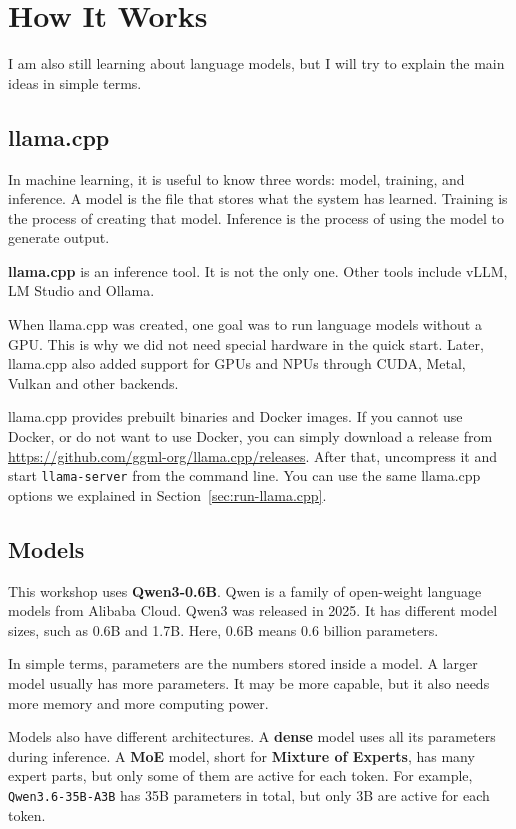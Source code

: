 \documentclass[a4paper,12pt]{article}
\begin{document}
\section{How It Works}

I am also still learning about language models, but I will try to explain the main ideas in simple terms.

\subsection{llama.cpp}
\label{sec:llama.cpp}

In machine learning, it is useful to know three words: model, training, and inference. A model is the file that stores what the system has learned. Training is the process of creating that model. Inference is the process of using the model to generate output.

\textbf{llama.cpp} is an inference tool. It is not the only one. Other tools include vLLM, LM Studio and Ollama.

When llama.cpp was created, one goal was to run language models without a GPU. This is why we did not need special hardware in the quick start. Later, llama.cpp also added support for GPUs and NPUs through CUDA, Metal, Vulkan and other backends.

llama.cpp provides prebuilt binaries and Docker images. If you cannot use Docker, or do not want to use Docker, you can simply download a release from \url{https://github.com/ggml-org/llama.cpp/releases}. After that, uncompress it and start \texttt{llama-server} from the command line. You can use the same llama.cpp options we explained in Section~\ref{sec:run-llama.cpp}.

\subsection{Models}
\label{sec:models}

This workshop uses \textbf{Qwen3-0.6B}. Qwen is a family of open-weight language models from Alibaba Cloud. Qwen3 was released in 2025. It has different model sizes, such as 0.6B and 1.7B. Here, 0.6B means 0.6 billion parameters.

In simple terms, parameters are the numbers stored inside a model. A larger model usually has more parameters. It may be more capable, but it also needs more memory and more computing power.

Models also have different architectures. A \textbf{dense} model uses all its parameters during inference. A \textbf{MoE} model, short for \textbf{Mixture of Experts}, has many expert parts, but only some of them are active for each token. For example, \texttt{Qwen3.6-35B-A3B} has 35B parameters in total, but only 3B are active for each token.
\end{document}
